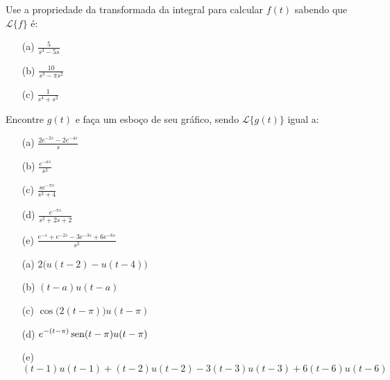 \documentclass[Main.tex]{subfiles}
\begin{document}
\begin{Exercise}
Use a propriedade da transformada da integral para calcular $f(t)$ sabendo que $\mathcal{L}\{f \} $ é:

\begin{itemize}
  \item[(a)] $\displaystyle \frac{5}{s^3 - 5s}$
  \item[(b)] $\displaystyle \frac{10}{s^3 - \pi s^2}$
  \item[(c)] $\displaystyle \frac{1}{s^4 + s^2}$
\end{itemize}

\end{Exercise}
\begin{Exercise}
Encontre $g(t)$ e faça um esboço de seu gráfico, sendo $\mathcal{L}\{ g(t)\}$ igual a:

\begin{itemize}
  \item[(a)] $\displaystyle \frac{2e^{-2s} - 2 e^{-4s}}{s}$
  \item[(b)] $\displaystyle \frac{e^{-as}}{s^2}$
  \item[(c)] $\displaystyle \frac{se^{-\pi s}}{s^2+4}$
  \item[(d)] $\displaystyle \frac{e^{-\pi s}}{s^2 + 2s +2}$
  \item[(e)] $\displaystyle \frac{e^{-s}+ e^{-2s} -3 e^{-3s} +6 e^{-6s}}{s^2}$
\end{itemize}

\end{Exercise}
\begin{Answer}
 
\begin{itemize}

\item[(a)] $\displaystyle 2 \big( u(t-2) - u(t-4) \big)$
  \item[(b)] $\displaystyle (t-a)u(t-a)$
  \item[(c)] $\displaystyle \cos\big(2(t-\pi)\big)u(t-\pi)$
  \item[(d)] $\displaystyle e^{-(t-\pi)} \operatorname{sen}(t-\pi)u(t-\pi)$
  \item[(e)] $\displaystyle (t-1)u(t-1) + (t-2)u(t-2) -3(t-3)u(t-3) + 6(t-6)u(t-6)$
\end{itemize}

\end{Answer}
\end{document}
